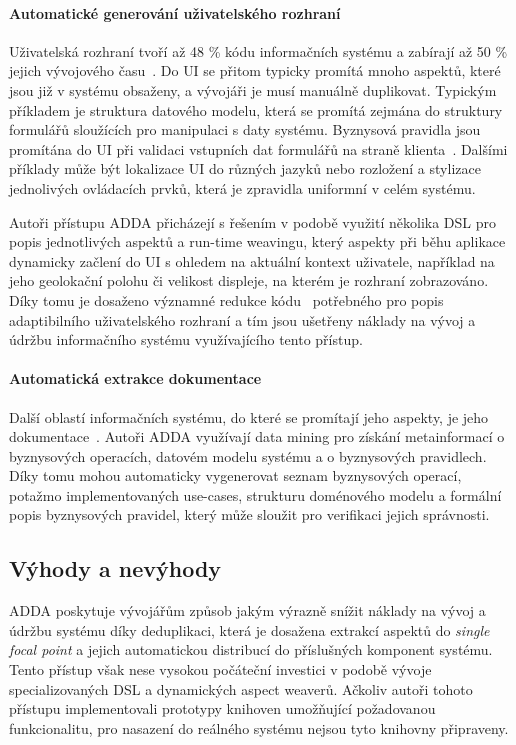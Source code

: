 \paragraph{Automatické generování uživatelského rozhraní}

Uživatelská rozhraní tvoří až 48 \% kódu informačních systému
a zabírají až 50 \% jejich vývojového času~\cite{kennard2009separation}.
Do \gls{UI} se přitom typicky promítá mnoho aspektů, které jsou
již v systému obsaženy, a vývojáři je musí manuálně duplikovat.
Typickým příkladem je struktura datového modelu, která se promítá
zejmána do struktury formulářů sloužících pro manipulaci s daty systému.
Byznysová pravidla jsou promítána do \gls{UI} při validaci vstupních
dat formulářů na straně klienta~\cite{cemus2017separation}.
Dalšími příklady může být lokalizace \gls{UI} do různých jazyků
nebo rozložení a stylizace jednolivých ovládacích prvků, která
je zpravidla uniformní v celém systému.

Autoři přístupu \gls{ADDA} přicházejí s řešením v podobě
využití několika \gls{DSL} pro popis jednotlivých aspektů
a run-time weavingu, který aspekty při běhu aplikace
dynamicky začlení do \gls{UI} s ohledem na aktuální kontext
uživatele, například na jeho geolokační polohu či velikost
displeje, na kterém je rozhraní zobrazováno.
Díky tomu je dosaženo významné redukce kódu~\cite{cemus2016context}
potřebného pro popis adaptibilního uživatelského rozhraní
a tím jsou ušetřeny náklady na vývoj a údržbu informačního
systému využívajícího tento přístup.

\paragraph{Automatická extrakce dokumentace}

Další oblastí informačních systému, do které se promítají jeho aspekty,
je jeho dokumentace~\cite{cemus2017automated}. Autoři \gls{ADDA}
využívají data mining pro získání metainformací o byznysových operacích,
datovém modelu systému a o byznysových pravidlech. Díky tomu mohou
automaticky vygenerovat seznam byznysových operací, potažmo implementovaných
use-cases, strukturu doménového modelu a formální popis byznysových pravidel,
který může sloužit pro verifikaci jejich správnosti.

\subsection{Výhody a nevýhody}

\gls{ADDA} poskytuje vývojářům způsob jakým výrazně snížit náklady na vývoj a údržbu
systému díky deduplikaci, která je dosažena extrakcí aspektů
do \textit{single focal point} a jejich automatickou distribucí do
příslušných komponent systému. Tento přístup však nese vysokou počáteční investici v
podobě vývoje specializovaných \gls{DSL} a dynamických aspect weaverů.
Ačkoliv autoři tohoto přístupu implementovali prototypy knihoven umožňující
požadovanou funkcionalitu, pro nasazení do reálného systému
nejsou tyto knihovny připraveny.

